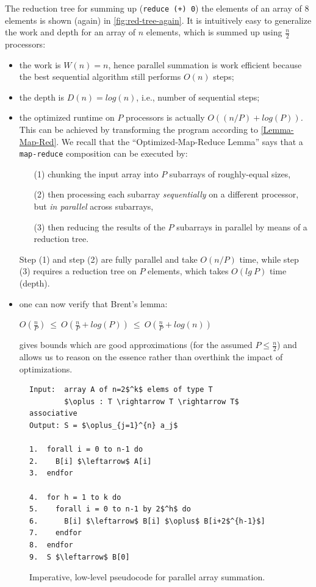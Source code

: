 \documentclass[acmsmall,review]{acmart}\settopmatter{printfolios=true,printccs=false,printacmref=false}
\begin{document}
The reduction tree for summing up (\lstinline{reduce (+) 0}) the elements 
of an array of $8$ elements is shown (again) in \cref{fig:red-tree-again}.
It is intuitively easy to generalize the work and depth for an array of
$n$ elements, which is summed up using $\frac{n}{2}$ processors:
\begin{itemize}
    \item the work is $W(n) = n$, hence parallel summation is work efficient
        because the best sequential algorithm still performs $O(n)$ steps;
    \item the depth is $D(n) = log(n)$, i.e., number of sequential steps;
    \item the optimized runtime on $P$ processors is actually 
            \emph{$O((n/P) + log(P))$.} This can be achieved by
            transforming the program according to \cref{Lemma-Map-Red}. 
            We recall that the ``Optimized-Map-Reduce Lemma'' says that
            a \lstinline{map-reduce} composition can be executed by:
        \begin{itemize}
            \item[(1)] chunking the input array into $P$ subarrays of roughly-equal 
            sizes,
            \item[(2)] then processing each subarray \emph{sequentially} on a 
            different processor, but \emph{in parallel} across subarrays,
            \item[(3)] then reducing the results of the $P$ subarrays
            in parallel by means of a reduction tree.
        \end{itemize}
            Step (1) and step (2) are fully parallel and take $O(n/P)$ time, 
            while step (3) requires 
            a reduction tree on $P$ elements, which takes $O(lg \ P)$ time (depth).
    \item one can now verify that Brent's lemma:\\
            \begin{center} $O(\frac{n}{P}) ~\leq ~O(\frac{n}{P} + log(P)) ~\leq~ O(\frac{n}{P} + log(n))$ \end{center}
          gives bounds which are good approximations (for the assumed $P \leq \frac{n}{2}$) 
            and allows us to reason on the essence rather than overthink the 
            impact of optimizations.
\end{itemize}

\begin{figure}
\begin{lstlisting}[mathescape=true]
Input:  array A of n=2$^k$ elems of type T
        $\oplus : T \rightarrow T \rightarrow T$ associative
Output: S = $\oplus_{j=1}^{n} a_j$

1.  forall i = 0 to n-1 do
2.    B[i] $\leftarrow$ A[i]
3.  endfor

4.  for h = 1 to k do
5.    forall i = 0 to n-1 by 2$^h$ do 
6.      B[i] $\leftarrow$ B[i] $\oplus$ B[i+2$^{h-1}$]
7.    endfor
8.  endfor
9.  S $\leftarrow$ B[0]  
\end{lstlisting}\vspace{-4ex}
\caption{Imperative, low-level pseudocode for parallel array summation.}
\label{fig-red-imp-pseudo}
\end{figure}
\end{document}
